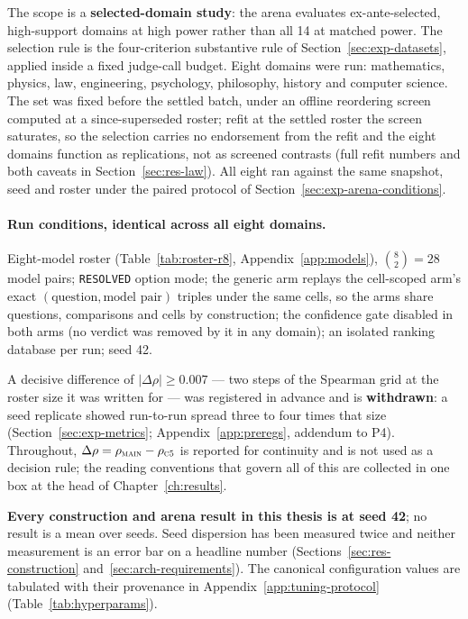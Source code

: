 The scope is a \textbf{selected-domain study}: the arena evaluates
ex-ante-selected, high-support domains at high power rather than
all 14 at matched power. The selection rule is the four-criterion
substantive rule of Section~\ref{sec:exp-datasets}, applied inside a
fixed judge-call budget. Eight domains were run: mathematics, physics,
law, engineering, psychology, philosophy, history and computer science.
The set was fixed before the settled batch, under an offline
reordering screen computed at a since-superseded roster; refit at the
settled roster the screen saturates, so the selection carries no
endorsement from the refit and the eight domains function as
replications, not as screened contrasts (full refit numbers and both
caveats in Section~\ref{sec:res-law}). All eight ran against the same
snapshot, seed and roster under the paired protocol of
Section~\ref{sec:exp-arena-conditions}.

\paragraph{Run conditions, identical across all eight domains.}
Eight-model roster (Table~\ref{tab:roster-r8},
Appendix~\ref{app:models}), $\binom{8}{2} = 28$ model pairs;
\texttt{RESOLVED} option mode; the generic arm replays the cell-scoped
arm's exact $(\text{question}, \text{model pair})$ triples under the
same cells, so the arms share questions, comparisons and cells by
construction; the confidence gate disabled in both arms (no verdict was
removed by it in any domain); an isolated ranking database per run;
seed 42.

A decisive difference of $|\Delta\rho| \geq 0.007$ --- two steps of the
Spearman grid at the roster size it was written for --- was registered
in advance and is \textbf{withdrawn}: a seed replicate showed
run-to-run spread three to four times that size
(Section~\ref{sec:exp-metrics}; Appendix~\ref{app:preregs}, addendum
to P4). Throughout,
$\Delta\rho = \rho_{\textsc{main}} - \rho_{\textsc{c5}}$ is reported
for continuity and is not used as a decision rule; the reading
conventions that govern all of this are collected in one box at the
head of Chapter~\ref{ch:results}.

\textbf{Every construction and arena result in this thesis is at seed
42}; no result is a mean over seeds. Seed dispersion has been
measured twice and neither measurement is an error bar on a headline
number (Sections~\ref{sec:res-construction}
and~\ref{sec:arch-requirements}). The canonical configuration values
are tabulated with their provenance in
Appendix~\ref{app:tuning-protocol} (Table~\ref{tab:hyperparams}).

